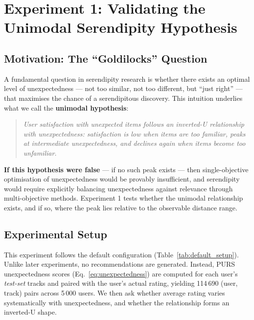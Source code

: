 
\section{Experiment 1: Validating the Unimodal Serendipity Hypothesis}
\label{sec:experiment1}

\subsection{Motivation: The ``Goldilocks'' Question}

A fundamental question in serendipity research is whether there exists an
optimal level of unexpectedness --- not too similar, not too different, but
``just right'' --- that maximises the chance of a serendipitous discovery.
This intuition underlies what we call the \textbf{unimodal hypothesis}:

\begin{quote}
\textit{User satisfaction with unexpected items follows an inverted-U
relationship with unexpectedness: satisfaction is low when items are too
familiar, peaks at intermediate unexpectedness, and declines again when items
become too unfamiliar.}
\end{quote}

\textbf{If this hypothesis were false} --- if no such peak exists --- then
single-objective optimisation of unexpectedness would be provably insufficient,
and serendipity would require explicitly balancing unexpectedness against
relevance through multi-objective methods.  Experiment 1 tests whether the
unimodal relationship exists, and if so, where the peak lies relative to the
observable distance range.

\subsection{Experimental Setup}

This experiment follows the default configuration (Table~\ref{tab:default_setup}).
Unlike later experiments, no recommendations are generated.  Instead, PURS
unexpectedness scores (Eq.~\ref{eq:unexpectedness}) are computed for each
user's \emph{test-set} tracks and paired with the user's actual rating,
yielding 114\,690 (user, track) pairs across 5\,000 users.  We then ask
whether average rating varies systematically with unexpectedness, and whether
the relationship forms an inverted-U shape.

